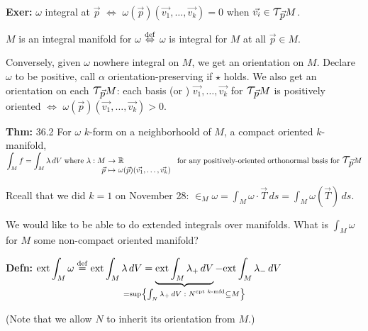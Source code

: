 \documentclass[10pt,letterpaper]{article}
\newcommand{\n}{\hfill\break}
\newcommand{\defn}[1]{\par\noindent\settowidth{\hangindent}{\textbf{Defn: }}\textbf{Defn: }#1\n}
\newcommand{\thm}[1]{\par\noindent\settowidth{\hangindent}{\textbf{Thm: }}\textbf{Thm: }#1\n}
\newcommand{\exer}[1]{\par\noindent\settowidth{\hangindent}{\textbf{Exer: }}\textbf{Exer: }#1\n}
\newcommand{\ptxt}[1]{\textrm{\textnormal{#1}}}
\newcommand{\set}[1]{\left\{#1\right\}}
\newcommand{\reals}{\mathbb{R}}
\newcommand{\R}{\reals}
\newcommand{\map}[4]{\!\!\!\begin{array}[t]{rcl}#1 & \!\!\!\!\to & \!\!\!\!#2\\ #3 & \!\!\!\!\mapsto & \!\!\!\!#4\end{array}}
\newcommand{\Tau}{\mathlarger{\mathlarger{\mathlarger{\mathlarger{\tau}}}}}
\newcommand{\extint}{\ptxt{ext}\int}
\newcommand{\iffdef}{\overset{\ptxt{def}}{\Leftrightarrow}}
\newcommand{\eqdef}{\overset{\ptxt{def}}{=}}
\let\u\relax
\newcommand{\u}[1]{\underline{#1}}
\begin{document}
\exer{$\omega$ integral at $\vec{p}$ $\Leftrightarrow$ $\omega(\vec{p})(\vec{v_{1}},\ldots,\vec{v_{k}})=0$ when $\vec{v_{i}}\in\Tau_{\vec{p}}M$.}

\par\noindent $M$ is an integral manifold for $\omega$ $\iffdef$ $\omega$ is integral for $M$ at all $\vec{p}\in{}M$.\n

\par\noindent Conversely, given $\omega$ nowhere integral on $M$, we get an orientation on $M$. Declare $\omega$ to be positive, call $\alpha$ orientation-preserving if $\star$ holds. We also get an orientation on each $\Tau_{\vec{p}}M$: each basis (or \u{frame}) $\vec{v_{1}},\ldots,\vec{v_{k}}$ for $\Tau_{\vec{p}}M$ is positively oriented $\Leftrightarrow$ $\omega(\vec{p})(\vec{v_{1}},\ldots,\vec{v_{k}})>0$.\n

\thm{36.2 For $\omega$ $k$-form on a neighborhoold of $M$, a compact oriented $k$-manifold,\n
$\displaystyle\int_{M}f=\int_{M}\lambda\,dV\;\ptxt{where }\map{\lambda:M}{\R}{\vec{p}}{\omega(\vec{p})(\vec{v_{1}},\ldots,\vec{v_{k}})}\ptxt{ for any positively-oriented orthonormal basis for $\Tau_{\vec{p}}M$}$}

\par\noindent Rceall that we did $k=1$ on November 28: $\displaystyle\in_{M}\omega=\int_{M}\omega\cdot\vec{T}\,ds=\int_{M}\omega(\vec{T})\,ds$.\n

\par\noindent We would like to be able to do extended integrals over manifolds. What is $\int_{M}\omega$ for $M$ some non-compact oriented manifold?\n

\defn{$\displaystyle\extint_{M}\omega\eqdef\extint_{M}\lambda\,dV=\underbrace{\extint_{M}\lambda_{+}\,dV}_{\mathclap{=\sup\set{\int_{N}\lambda_{+}\,dV\;:\;N^{\ptxt{cpt $k$-mfd}}\subseteq{}M}}}-\extint_{M}\lambda_{-}\,dV$}

\par\noindent (Note that we allow $N$ to inherit its orientation from $M$.)\n
\end{document}
